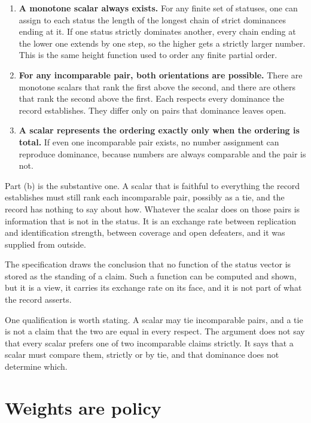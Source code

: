 \documentclass[11pt]{article}
\begin{document}
\begin{enumerate}[label=(\alph*)]
\item \textbf{A monotone scalar always exists.} For any finite set of statuses, one can assign to each status the length of the longest chain of strict dominances ending at it. If one status strictly dominates another, every chain ending at the lower one extends by one step, so the higher gets a strictly larger number. This is the same height function used to order any finite partial order.
\item \textbf{For any incomparable pair, both orientations are possible.} There are monotone scalars that rank the first above the second, and there are others that rank the second above the first. Each respects every dominance the record establishes. They differ only on pairs that dominance leaves open.
\item \textbf{A scalar represents the ordering exactly only when the ordering is total.} If even one incomparable pair exists, no number assignment can reproduce dominance, because numbers are always comparable and the pair is not.
\end{enumerate}

Part (b) is the substantive one. A scalar that is faithful to everything the record establishes must still rank each incomparable pair, possibly as a tie, and the record has nothing to say about how. Whatever the scalar does on those pairs is information that is not in the status. It is an exchange rate between replication and identification strength, between coverage and open defeaters, and it was supplied from outside.

The specification draws the conclusion that no function of the status vector is stored as the standing of a claim. Such a function can be computed and shown, but it is a view, it carries its exchange rate on its face, and it is not part of what the record asserts.

One qualification is worth stating. A scalar may tie incomparable pairs, and a tie is not a claim that the two are equal in every respect. The argument does not say that every scalar prefers one of two incomparable claims strictly. It says that a scalar must compare them, strictly or by tie, and that dominance does not determine which.

\section{Weights are policy}\label{sec:weights}
\end{document}
